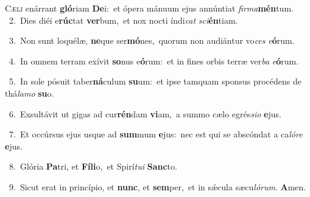 \lettrine{\initial\textcolor{\initialcolor}{C}}{æli} enárrant \textbf{gló}\-riam \textbf{De}\-i:~\star et ópera mánuum ejus annúntiat \textit{fir}\-\textit{ma}\textbf{mén}tum.\\
{\numbfont\textcolor{\numbcolor}{~2.}}~Dies diéi e\-\textbf{rúc}\-tat \textbf{ver}\-bum,~\star et nox nocti índi\textit{cat} \textit{sci}\-\textbf{én}tiam.\par
{\numbfont\textcolor{\numbcolor}{~3.}}~Non sunt loquélæ, \textbf{ne}\-que ser\-\textbf{mó}\-nes,~\star quorum non audiántur vo\textit{ces} \textit{e}\-\textbf{ó}rum.\par
{\numbfont\textcolor{\numbcolor}{~4.}}~In omnem terram exívit \textbf{so}\-nus e\-\textbf{ó}\-rum:~\star et in fines orbis terræ ver\textit{ba} \textit{e}\-\textbf{ó}rum.\par
{\numbfont\textcolor{\numbcolor}{~5.}}~In sole pósuit taber\-\textbf{ná}\-culum \textbf{su}\-um:~\star et ipse tamquam sponsus procédens de thá\-\textit{la}\-\textit{mo} \textbf{su}\-o.\par
{\numbfont\textcolor{\numbcolor}{~6.}}~Exsultávit ut gigas ad cur\-\textbf{rén}\-dam \textbf{vi}\-am,~\star a summo cælo egrés\-\textit{si}\-\textit{o} \textbf{e}\-jus.\par
{\numbfont\textcolor{\numbcolor}{~7.}}~Et occúrsus ejus usque ad \textbf{sum}\-mum \textbf{e}\-jus:~\star nec est qui se abscóndat a ca\-\textit{ló}\-\textit{re} \textbf{e}\-jus.\par
{\numbfont\textcolor{\numbcolor}{~8.}}~Glória \textbf{Pa}\-tri, et \textbf{Fí}\-\textbf{li}o,~\star et Spirí\-\textit{tu}\-\textit{i} \textbf{Sanc}\-to.\par
{\numbfont\textcolor{\numbcolor}{~9.}}~Sicut erat in princípio, et \textbf{nunc}\-, et \textbf{sem}\-per,~\star et in sǽcula sæcu\-\textit{ló}\-\textit{rum}. \textbf{A}\-men.\par
